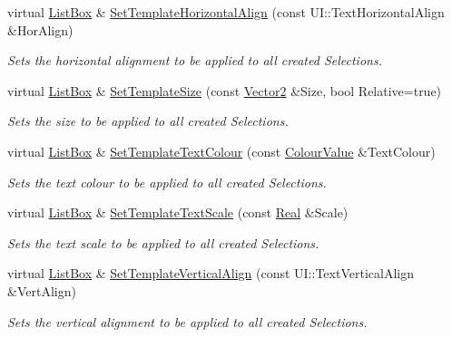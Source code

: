 \begin{DoxyCompactItemize}
virtual \hyperlink{classphys_1_1UI_1_1ListBox}{ListBox} \& \hyperlink{classphys_1_1UI_1_1ListBox_a00ccdbe0b3a8da306b7346dff04792e0}{SetTemplateHorizontalAlign} (const UI::TextHorizontalAlign \&HorAlign)
\begin{DoxyCompactList}\small\item\em Sets the horizontal alignment to be applied to all created Selections. \item\end{DoxyCompactList}\item 
virtual \hyperlink{classphys_1_1UI_1_1ListBox}{ListBox} \& \hyperlink{classphys_1_1UI_1_1ListBox_abe6281a6f885be920ba540b81df3cf59}{SetTemplateSize} (const \hyperlink{classphys_1_1Vector2}{Vector2} \&Size, bool Relative=true)
\begin{DoxyCompactList}\small\item\em Sets the size to be applied to all created Selections. \item\end{DoxyCompactList}\item 
virtual \hyperlink{classphys_1_1UI_1_1ListBox}{ListBox} \& \hyperlink{classphys_1_1UI_1_1ListBox_a0106fde625c9e950f27a3e2611444359}{SetTemplateTextColour} (const \hyperlink{classphys_1_1ColourValue}{ColourValue} \&TextColour)
\begin{DoxyCompactList}\small\item\em Sets the text colour to be applied to all created Selections. \item\end{DoxyCompactList}\item 
virtual \hyperlink{classphys_1_1UI_1_1ListBox}{ListBox} \& \hyperlink{classphys_1_1UI_1_1ListBox_a160bc4d74c99f544a4339a3ba050868a}{SetTemplateTextScale} (const \hyperlink{namespacephys_af7eb897198d265b8e868f45240230d5f}{Real} \&Scale)
\begin{DoxyCompactList}\small\item\em Sets the text scale to be applied to all created Selections. \item\end{DoxyCompactList}\item 
virtual \hyperlink{classphys_1_1UI_1_1ListBox}{ListBox} \& \hyperlink{classphys_1_1UI_1_1ListBox_ab3b48e58a0049552c22aa17b7b8e8f1f}{SetTemplateVerticalAlign} (const UI::TextVerticalAlign \&VertAlign)
\begin{DoxyCompactList}\small\item\em Sets the vertical alignment to be applied to all created Selections. \item\end{DoxyCompactList}\item 

\end{DoxyCompactItemize}
